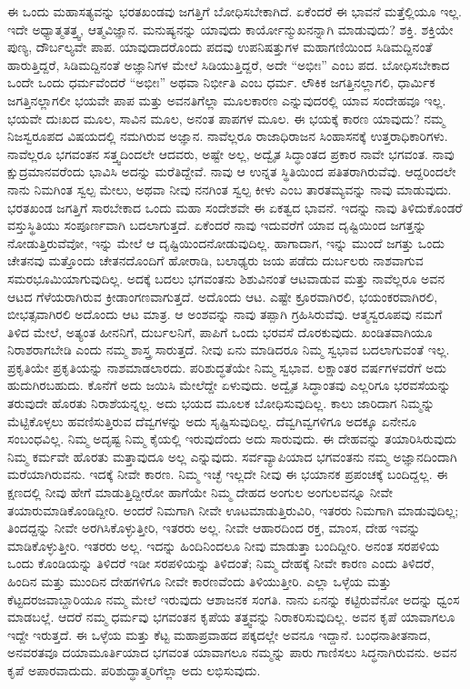 ಈ ಒಂದು ಮಹಾಸತ್ಯವನ್ನು ಭರತಖಂಡವು ಜಗತ್ತಿಗೆ ಬೋಧಿಸಬೇಕಾಗಿದೆ. ಏಕೆಂದರೆ ಈ ಭಾವನೆ ಮತ್ತೆಲ್ಲಿಯೂ ಇಲ್ಲ. ಇದೇ ಅಧ್ಯಾತ್ಮತತ್ತ್ವ, ಆತ್ಮವಿಜ್ಞಾನ. ಮನುಷ್ಯನನ್ನು ಯಾವುದು ಕಾರ್ಯೋನ್ಮುಖನನ್ನಾಗಿ ಮಾಡುವುದು? ಶಕ್ತಿ. ಶಕ್ತಿಯೇ ಪುಣ್ಯ, ದೌರ್ಬಲ್ಯವೇ ಪಾಪ. ಯಾವುದಾದರೊಂದು ಪದವು ಉಪನಿಷತ್ತುಗಳ ಮಹಾಗಣಿಯಿಂದ ಸಿಡಿಮದ್ದಿನಂತೆ ಹಾರುತ್ತಿದ್ದರೆ, ಸಿಡಿಮದ್ದಿನಂತೆ ಅಜ್ಞಾನಿಗಳ ಮೇಲೆ ಸಿಡಿಯುತ್ತಿದ್ದರೆ, ಅದೇ “ಅಭೀಃ” ಎಂಬ ಪದ. ಬೋಧಿಸಬೇಕಾದ ಒಂದೇ ಒಂದು ಧರ್ಮವೆಂದರೆ “ಅಭೀಃ” ಅಥವಾ ನಿರ್ಭೀತಿ ಎಂಬ ಧರ್ಮ. ಲೌಕಿಕ ಜಗತ್ತಿನಲ್ಲಾಗಲಿ, ಧಾರ್ಮಿಕ ಜಗತ್ತಿನಲ್ಲಾಗಲೀ ಭಯವೇ ಪಾಪ ಮತ್ತು ಅವನತಿಗೆಲ್ಲಾ ಮೂಲಕಾರಣ ಎನ್ನುವುದರಲ್ಲಿ ಯಾವ ಸಂದೇಹವೂ ಇಲ್ಲ. ಭಯವೇ ದುಃಖದ ಮೂಲ, ಸಾವಿನ ಮೂಲ, ಅನಂತ ಪಾಪಗಳ ಮೂಲ. ಈ ಭಯಕ್ಕೆ ಕಾರಣ ಯಾವುದು? ನಮ್ಮ ನಿಜಸ್ವರೂಪದ ವಿಷಯದಲ್ಲಿ ನಮಗಿರುವ ಅಜ್ಞಾನ. ನಾವೆಲ್ಲರೂ ರಾಜಾಧಿರಾಜನ ಸಿಂಹಾಸನಕ್ಕೆ ಉತ್ತರಾಧಿಕಾರಿಗಳು. ನಾವೆಲ್ಲರೂ ಭಗವಂತನ ಸತ್ತ್ವದಿಂದಲೇ ಆದವರು, ಅಷ್ಟೇ ಅಲ್ಲ, ಅದ್ವೈತ ಸಿದ್ಧಾಂತದ ಪ್ರಕಾರ ನಾವೇ ಭಗವಂತ. ನಾವು ಕ್ಷುದ್ರಮಾನವರೆಂದು ಭಾವಿಸಿ ಅದನ್ನು ಮರೆತಿದ್ದೇವೆ. ನಾವು ಆ ಉನ್ನತ ಸ್ಥಿತಿಯಿಂದ ಪತಿತರಾಗಿರುವೆವು. ಆದ್ದರಿಂದಲೇ ನಾನು ನಿಮಗಿಂತ ಸ್ವಲ್ಪ ಮೇಲು, ಅಥವಾ ನೀವು ನನಗಿಂತ ಸ್ವಲ್ಪ ಕೀಳು ಎಂಬ ತಾರತಮ್ಯವನ್ನು ನಾವು ಮಾಡುವುದು. ಭರತಖಂಡ ಜಗತ್ತಿಗೆ ಸಾರಬೇಕಾದ ಒಂದು ಮಹಾ ಸಂದೇಶವೇ ಈ ಏಕತ್ವದ ಭಾವನೆ. ಇದನ್ನು ನಾವು ತಿಳಿದುಕೊಂಡರೆ ವಸ್ತುಸ್ಥಿತಿಯು ಸಂಪೂರ್ಣವಾಗಿ ಬದಲಾಗುತ್ತದೆ. ಏಕೆಂದರೆ ನಾವು ಇದುವರೆಗೆ ಯಾವ ದೃಷ್ಟಿಯಿಂದ ಜಗತ್ತನ್ನು ನೋಡುತ್ತಿರುವೆವೋ, ಇನ್ನು ಮೇಲೆ ಆ ದೃಷ್ಟಿಯಿಂದ\break ನೋಡುವುದಿಲ್ಲ. ಹಾಗಾದಾಗ, ಇನ್ನು ಮುಂದೆ ಜಗತ್ತು ಒಂದು ಚೇತನವು ಮತ್ತೊಂದು ಚೇತನದೊಂದಿಗೆ ಹೋರಾಡಿ, ಬಲಾಢ್ಯರು ಜಯ ಪಡೆದು ದುರ್ಬಲರು ನಾಶವಾಗುವ ಸಮರಭೂಮಿಯಾಗುವುದಿಲ್ಲ. ಅದಕ್ಕೆ ಬದಲು ಭಗವಂತನು ಶಿಶುವಿನಂತೆ ಆಟವಾಡುವ ಮತ್ತು ನಾವೆಲ್ಲರೂ ಅವನ ಆಟದ ಗೆಳೆಯರಾಗಿರುವ ಕ್ರೀಡಾಂಗಣವಾಗುತ್ತದೆ. ಅದೊಂದು ಆಟ. ಎಷ್ಟೇ ಕ್ರೂರವಾಗಿರಲಿ, ಭಯಂಕರವಾಗಿರಲಿ, ಬೀಭತ್ಸವಾಗಿರಲಿ ಅದೊಂದು ಆಟ ಮಾತ್ರ. ಆ ಅಂಶವನ್ನು ನಾವು ತಪ್ಪಾಗಿ ಗ್ರಹಿಸಿರುವೆವು. ಆತ್ಮಸ್ವರೂಪವು ನಮಗೆ ತಿಳಿದ ಮೇಲೆ, ಅತ್ಯಂತ ಹೀನನಿಗೆ, ದುರ್ಬಲನಿಗೆ, ಪಾಪಿಗೆ ಒಂದು ಭರವಸೆ ದೊರಕುವುದು. ಖಂಡಿತವಾಗಿಯೂ ನಿರಾಶರಾಗಬೇಡಿ ಎಂದು ನಮ್ಮ ಶಾಸ್ತ್ರ ಸಾರುತ್ತದೆ. ನೀವು ಏನು ಮಾಡಿದರೂ ನಿಮ್ಮ ಸ್ವಭಾವ ಬದಲಾಗುವಂತೆ ಇಲ್ಲ. ಪ್ರಕೃತಿಯೇ ಪ್ರಕೃತಿಯನ್ನು ನಾಶಮಾಡಲಾರದು. ಪರಿಶುದ್ಧತೆಯೇ ನಿಮ್ಮ ಸ್ವಭಾವ. ಲಕ್ಷಾಂತರ ವರ್ಷಗಳವರೆಗೆ ಅದು ಹುದುಗಿರಬಹುದು. ಕೊನೆಗೆ ಅದು ಜಯಿಸಿ ಮೇಲೆದ್ದೇ ಏಳುವುದು. ಅದ್ವೈತ ಸಿದ್ಧಾಂತವು ಎಲ್ಲರಿಗೂ ಭರವಸೆಯನ್ನು ತರುವುದೇ ಹೊರತು ನಿರಾಶೆಯನ್ನಲ್ಲ. ಅದು ಭಯದ ಮೂಲಕ ಬೋಧಿಸುವುದಿಲ್ಲ. ಕಾಲು ಜಾರಿದಾಗ ನಿಮ್ಮನ್ನು ಮೆಟ್ಟಿಕೊಳ್ಳಲು ಹವಣಿಸುತ್ತಿರುವ ದೆವ್ವಗಳನ್ನು ಅದು ಸೃಷ್ಟಿಸುವುದಿಲ್ಲ. ದೆವ್ವಗಿವ್ವಗಳಿಗೂ ಅದಕ್ಕೂ ಏನೇನೂ ಸಂಬಂಧವಿಲ್ಲ. ನಿಮ್ಮ ಅದೃಷ್ಟ ನಿಮ್ಮ ಕೈಯಲ್ಲಿ ಇರುವುದೆಂದು ಅದು ಸಾರುವುದು. ಈ ದೇಹವನ್ನು ತಯಾರಿಸಿರುವುದು ನಿಮ್ಮ ಕರ್ಮವೇ ಹೊರತು ಮತ್ತಾವುದೂ ಅಲ್ಲ ಎನ್ನುವುದು. ಸರ್ವವ್ಯಾಪಿಯಾದ ಭಗವಂತನು ನಮ್ಮ ಅಜ್ಞಾನದಿಂದಾಗಿ ಮರೆಯಾಗಿರುವನು. ಇದಕ್ಕೆ ನೀವೇ ಕಾರಣ. ನಿಮ್ಮ ಇಚ್ಛೆ ಇಲ್ಲದೇ ನೀವು ಈ ಭಯಾನಕ ಪ್ರಪಂಚಕ್ಕೆ ಬಂದಿದ್ದಲ್ಲ. ಈ ಕ್ಷಣದಲ್ಲಿ ನೀವು ಹೇಗೆ ಮಾಡುತ್ತಿದ್ದೀರೋ ಹಾಗೆಯೇ ನಿಮ್ಮ ದೇಹದ ಅಂಗುಲ ಅಂಗುಲವನ್ನೂ ನೀವೇ ತಯಾರುಮಾಡಿಕೊಂಡಿದ್ದೀರಿ. ಅಂದರೆ ನಿಮಗಾಗಿ ನೀವೇ ಊಟಮಾಡುತ್ತಿರುವಿರಿ, ಇತರರು ನಿಮಗಾಗಿ ಮಾಡುವುದಿಲ್ಲ; ತಿಂದದ್ದನ್ನು ನೀವೇ ಅರಗಿಸಿಕೊಳ್ಳುತ್ತೀರಿ, ಇತರರು ಅಲ್ಲ. ನೀವೇ ಆಹಾರದಿಂದ ರಕ್ತ, ಮಾಂಸ, ದೇಹ ಇವನ್ನು ಮಾಡಿಕೊಳ್ಳುತ್ತೀರಿ. ಇತರರು ಅಲ್ಲ. ಇದನ್ನು ಹಿಂದಿನಿಂದಲೂ ನೀವು ಮಾಡುತ್ತಾ ಬಂದಿದ್ದೀರಿ. ಅನಂತ ಸರಪಳಿಯ ಒಂದು ಕೊಂಡಿಯನ್ನು ತಿಳಿದರೆ ಇಡೀ ಸರಪಳಿಯನ್ನು ತಿಳಿದಂತೆ; ನಿಮ್ಮ ದೇಹಕ್ಕೆ ನೀವೇ ಕಾರಣ ಎಂದು ತಿಳಿದರೆ, ಹಿಂದಿನ ಮತ್ತು ಮುಂದಿನ ದೇಹಗಳಿಗೂ ನೀವೇ ಕಾರಣವೆಂದು ತಿಳಿಯುತ್ತೀರಿ. ಎಲ್ಲಾ ಒಳ್ಳೆಯ ಮತ್ತು ಕೆಟ್ಟದರ\break ಜವಾಬ್ದಾರಿಯೂ ನಮ್ಮ ಮೇಲೆ ಇರುವುದು ಆಶಾಜನಕ ಸಂಗತಿ. ನಾನು ಏನನ್ನು ಕಟ್ಟಿರುವೆನೋ ಅದನ್ನು ಧ್ವಂಸ ಮಾಡಬಲ್ಲೆ. ಆದರೆ ನಮ್ಮ ಧರ್ಮವು ಭಗವಂತನ ಕೃಪೆಯ ತತ್ತ್ವವನ್ನು ನಿರಾಕರಿಸುವುದಿಲ್ಲ. ಅವನ ಕೃಪೆ ಯಾವಾಗಲೂ ಇದ್ದೇ ಇರುತ್ತದೆ. ಈ ಒಳ್ಳೆಯ ಮತ್ತು ಕೆಟ್ಟ ಮಹಾಪ್ರವಾಹದ ಪಕ್ಕದಲ್ಲೇ ಅವನೂ ಇದ್ದಾನೆ. ಬಂಧನಾತೀತನಾದ, ಅನವರತವೂ ದಯಾಮೂರ್ತಿಯಾದ ಭಗವಂತ ಯಾವಾಗಲೂ ನಮ್ಮನ್ನು ಪಾರು ಗಾಣಿಸಲು ಸಿದ್ಧನಾಗಿರುವನು. ಅವನ ಕೃಪೆ ಅಪಾರವಾದುದು. ಪರಿಶುದ್ಧಾತ್ಮರಿಗೆಲ್ಲಾ ಅದು ಲಭಿಸುವುದು. 


